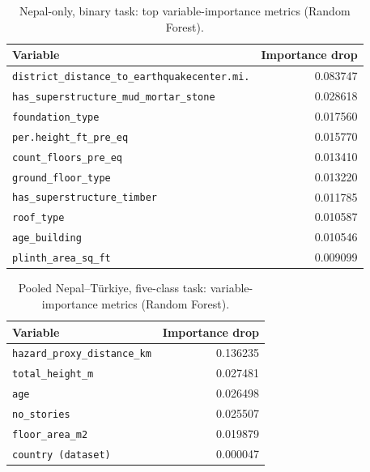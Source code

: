 \documentclass[11pt,a4paper]{article}
\begin{document}
\begin{table}[!h]
\centering
\caption{Nepal-only, binary task: top variable-importance metrics
(Random Forest).}
\label{tab:imp-nepal-2}
\small
\begin{tabular}{l r}
\toprule
Variable & Importance drop \\
\midrule
\texttt{district\_distance\_to\_earthquakecenter.mi.} & 0.083747 \\
\texttt{has\_superstructure\_mud\_mortar\_stone}      & 0.028618 \\
\texttt{foundation\_type}                              & 0.017560 \\
\texttt{per.height\_ft\_pre\_eq}                       & 0.015770 \\
\texttt{count\_floors\_pre\_eq}                        & 0.013410 \\
\texttt{ground\_floor\_type}                           & 0.013220 \\
\texttt{has\_superstructure\_timber}                   & 0.011785 \\
\texttt{roof\_type}                                    & 0.010587 \\
\texttt{age\_building}                                 & 0.010546 \\
\texttt{plinth\_area\_sq\_ft}                          & 0.009099 \\
\bottomrule
\end{tabular}
\end{table}

\begin{table}[!h]
\centering
\caption{Pooled Nepal--T\"urkiye, five-class task:
variable-importance metrics (Random Forest).}
\label{tab:imp-pooled-5}
\small
\begin{tabular}{l r}
\toprule
Variable & Importance drop \\
\midrule
\texttt{hazard\_proxy\_distance\_km} & 0.136235 \\
\texttt{total\_height\_m}             & 0.027481 \\
\texttt{age}                          & 0.026498 \\
\texttt{no\_stories}                  & 0.025507 \\
\texttt{floor\_area\_m2}              & 0.019879 \\
\texttt{country (dataset)}            & 0.000047 \\
\bottomrule
\end{tabular}
\end{table}
\end{document}
